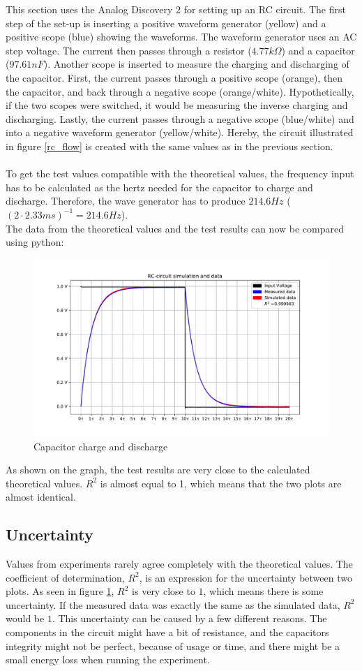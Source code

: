 This section uses the Analog Discovery 2 for setting up an RC circuit. The first step of the set-up is inserting a positive waveform generator (yellow) and a positive scope (blue) showing the waveforms. The waveform generator uses an AC step voltage. The current then passes through a resistor ($4.77 k\Omega$) and a capacitor ($97.61 nF$). Another scope is inserted to measure the charging and discharging of the capacitor. First, the current passes through a positive scope (orange), then the capacitor, and back through a negative scope (orange/white). Hypothetically, if the two scopes were switched, it would be measuring the inverse charging and discharging. Lastly, the current passes through a negative scope (blue/white) and into a negative waveform generator (yellow/white). Hereby, the circuit illustrated in figure \ref{rc_flow} is created with the same values as in the previous section. \\ \\
To get the test values compatible with the theoretical values, the frequency input has to be calculated as the hertz needed for the capacitor to charge and discharge. Therefore, the wave generator has to produce $214.6 Hz$  ($(2 \cdot 2.33 ms)^{-1} = 214.6 Hz$). \\
The data from the theoretical values and the test results can now be compared using python:
\begin{figure}[H]
\center
\includegraphics[scale=0.6]{fig/img/eks_1}
\caption{Capacitor charge and discharge}
\label{fig:Cap}
\end{figure}
\noindent As shown on the graph, the test results are very close to the calculated theoretical values. $R^2$ is almost equal to 1, which means that the two plots are almost identical.

\subsection{Uncertainty}
Values from experiments rarely agree completely with the theoretical values. The coefficient of determination, $R^2$, is an expression for the uncertainty between two plots. As seen in figure \ref{fig:Cap}, $R^2$ is very close to $1$, which means there is some uncertainty. If the measured data was exactly the same as the simulated data, $R^2$ would be $1$. This uncertainty can be caused by a few different reasons. The components in the circuit might have a bit of resistance, and the capacitors integrity might not be perfect, because of usage or time, and there might be a small energy loss when running the experiment. 